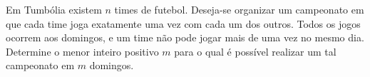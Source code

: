 Em Tumbólia existem $n$ times de futebol.
Deseja-se organizar um campeonato em que cada time joga exatamente uma vez com cada um dos outros.
Todos os jogos ocorrem aos domingos, e um time não pode jogar mais de uma vez no mesmo dia.
Determine o menor inteiro positivo $m$ para o qual é possível realizar um tal campeonato em $m$ domingos.